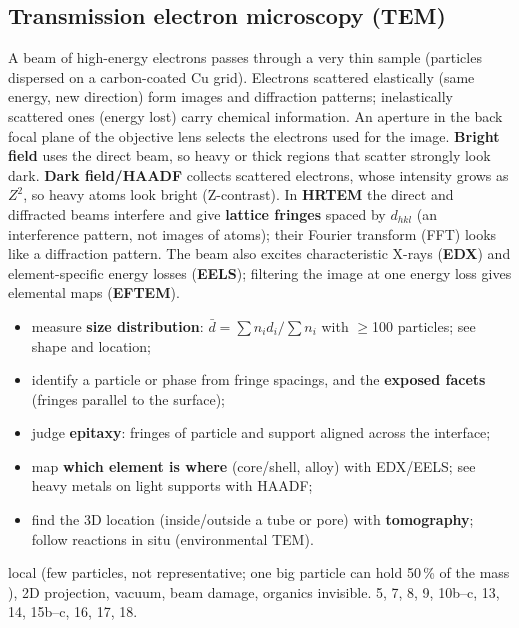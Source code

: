 \subsection{Transmission electron microscopy (TEM)}
{A beam of high-energy electrons passes through a very thin sample (particles dispersed on a carbon-coated Cu grid). Electrons
scattered elastically (same energy, new direction) form images and diffraction patterns; inelastically scattered ones (energy lost)
carry chemical information. An aperture in the back focal plane of the objective lens selects the electrons used for the image.
\textbf{Bright field} uses the direct beam, so heavy or thick regions that scatter strongly look dark. \textbf{Dark field/HAADF}
collects scattered electrons, whose intensity grows as $Z^2$, so heavy atoms look bright (Z-contrast). In \textbf{HRTEM} the direct
and diffracted beams interfere and give \textbf{lattice fringes} spaced by $d_{hkl}$ (an interference pattern, not images of atoms);
their Fourier transform (FFT) looks like a diffraction pattern. The beam also excites characteristic X-rays (\textbf{EDX}) and
element-specific energy losses (\textbf{EELS}); filtering the image at one energy loss gives elemental maps (\textbf{EFTEM}).}
{\begin{itemize}
 \item measure \textbf{size distribution}: $\bar d = \sum n_id_i/\sum n_i$ with $\geq$100 particles; see shape and location;
 \item identify a particle or phase from fringe spacings, and the \textbf{exposed facets} (fringes parallel to the surface);
 \item judge \textbf{epitaxy}: fringes of particle and support aligned across the interface;
 \item map \textbf{which element is where} (core/shell, alloy) with EDX/EELS; see heavy metals on light supports with HAADF;
 \item find the 3D location (inside/outside a tube or pore) with \textbf{tomography}; follow reactions in situ (environmental TEM).
\end{itemize}}
{local (few particles, not representative; one big particle can hold 50\,\% of the mass ), 2D projection, vacuum, beam
damage, organics invisible.}
{5, 7, 8, 9, 10b--c, 13, 14, 15b--c, 16, 17, 18.}

